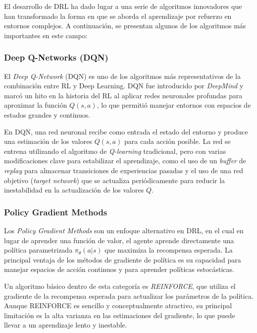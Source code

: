 \documentclass[a4paper,12pt]{report}
\begin{document}
El desarrollo de DRL ha dado lugar a una serie de algoritmos innovadores que han transformado la forma en que se aborda el aprendizaje por refuerzo en entornos complejos. A continuación, se presentan algunos de los algoritmos más importantes en este campo:

\subsubsection{Deep Q-Networks (DQN)}

El \textit{Deep Q-Network} (DQN) es uno de los algoritmos más representativos de la combinación entre RL y Deep Learning. DQN fue introducido por \textit{DeepMind} y marcó un hito en la historia del RL al aplicar redes neuronales profundas para aproximar la función \(Q(s, a)\), lo que permitió manejar entornos con espacios de estados grandes y continuos.

En DQN, una red neuronal recibe como entrada el estado del entorno y produce una estimación de los valores \(Q(s, a)\) para cada acción posible. La red se entrena utilizando el algoritmo de \textit{Q-learning} tradicional, pero con varias modificaciones clave para estabilizar el aprendizaje, como el uso de un \textit{buffer} de \textit{replay} para almacenar transiciones de experiencias pasadas y el uso de una red objetivo (\textit{target network}) que se actualiza periódicamente para reducir la inestabilidad en la actualización de los valores \(Q\).

\subsubsection{Policy Gradient Methods}

Los \textit{Policy Gradient Methods} son un enfoque alternativo en DRL, en el cual en lugar de aprender una función de valor, el agente aprende directamente una política parametrizada \(\pi_{\theta}(a|s)\) que maximiza la recompensa esperada. La principal ventaja de los métodos de gradiente de política es su capacidad para manejar espacios de acción continuos y para aprender políticas estocásticas.

Un algoritmo básico dentro de esta categoría es \textit{REINFORCE}, que utiliza el gradiente de la recompensa esperada para actualizar los parámetros de la política. Aunque REINFORCE es sencillo y conceptualmente atractivo, su principal limitación es la alta varianza en las estimaciones del gradiente, lo que puede llevar a un aprendizaje lento y inestable.
\end{document}
